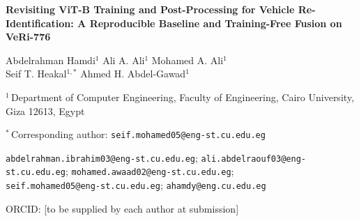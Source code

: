 \documentclass[10pt,a4paper]{article}
\begin{document}

\begin{center}
  {\LARGE\bfseries Revisiting ViT-B Training and Post-Processing for Vehicle
  Re-Identification: A Reproducible Baseline and Training-Free Fusion on
  VeRi-776\par}

  \vspace{1.4em}

  {\normalsize
   Abdelrahman Hamdi$^{1}$ \quad
   Ali A. Ali$^{1}$ \quad
   Mohamed A. Ali$^{1}$ \\[4pt]
   Seif T. Heakal$^{1,\ast}$ \quad
   Ahmed H. Abdel-Gawad$^{1}$\par}

  \vspace{0.9em}

  {\small $^{1}$\,Department of Computer Engineering, Faculty of Engineering,
   Cairo University, Giza 12613, Egypt\par}

  \vspace{0.5em}

  {\small $^{\ast}$\,Corresponding author:
   \texttt{seif.mohamed05@eng-st.cu.edu.eg}\par}

  \vspace{0.4em}

  {\footnotesize
   \texttt{abdelrahman.ibrahim03@eng-st.cu.edu.eg};\;
   \texttt{ali.abdelraouf03@eng-st.cu.edu.eg};\;
   \texttt{mohamed.awaad02@eng-st.cu.edu.eg};\\
   \texttt{seif.mohamed05@eng-st.cu.edu.eg};\;
   \texttt{ahamdy@eng.cu.edu.eg}\par}

  \vspace{0.4em}

  {\footnotesize ORCID: [to be supplied by each author at submission]\par}
\end{center}

\vspace{1.0em}
\end{document}
